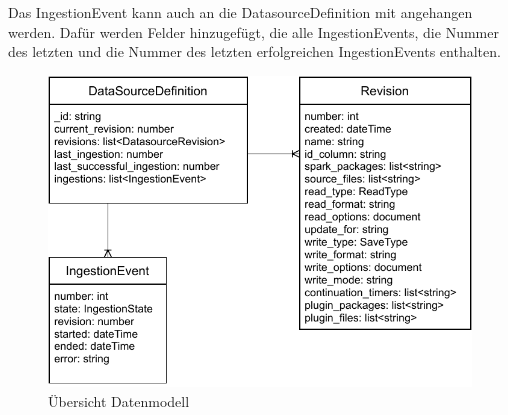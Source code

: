 Das IngestionEvent kann auch an die DatasourceDefinition mit angehangen werden.
Dafür werden Felder hinzugefügt, die alle IngestionEvents, die Nummer des letzten und die Nummer des letzten erfolgreichen IngestionEvents enthalten.

\begin{figure}
    \centering
    \includegraphics{Grafiken/Entwicklung-Datenmodell.pdf}
    \caption{Übersicht Datenmodell}
    \label{fig:datenmodell}
\end{figure}